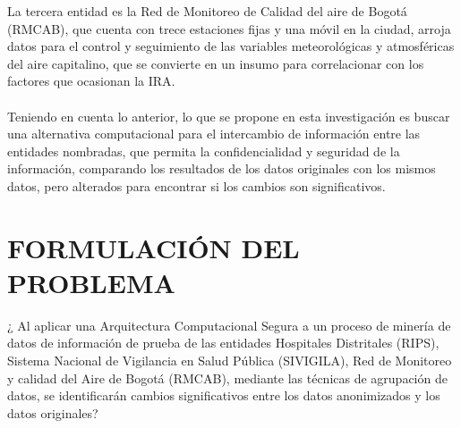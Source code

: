 \documentclass[a4paper,openright,12pt]{book}
\theoremstyle{definition}
\theoremstyle{remark}
\begin{document}
La tercera entidad es la Red de Monitoreo de Calidad del aire de Bogotá (RMCAB), que cuenta con trece estaciones fijas y una móvil en la ciudad, arroja datos para el control y seguimiento de las variables meteorológicas y atmosféricas del aire capitalino, que se convierte en un insumo para correlacionar con los factores que ocasionan la IRA.\\\\
Teniendo  en cuenta lo anterior, lo  que se propone  en esta investigación es buscar una alternativa computacional para el intercambio de información entre las entidades nombradas, que permita la confidencialidad y seguridad de la información, comparando los resultados de los datos originales con los mismos datos, pero alterados para encontrar si los cambios son significativos.

\section{FORMULACIÓN DEL PROBLEMA}

¿ Al aplicar una Arquitectura Computacional Segura a un proceso de minería de datos de información de prueba de las entidades Hospitales Distritales (RIPS), Sistema Nacional de Vigilancia en Salud Pública (SIVIGILA), Red de Monitoreo y calidad del Aire de Bogotá (RMCAB), mediante las técnicas de agrupación de datos, se identificarán cambios significativos entre los datos anonimizados y los datos originales?
\end{document}
